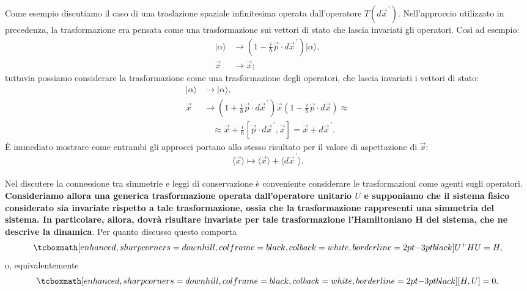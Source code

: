 Come esempio discutiamo il caso di una traslazione spaziale infinitesima operata dall'operatore $T(d\vec{x}^{\,\prime})$.
Nell'approccio utilizzato in precedenza, la trasformazione era pensata come una trasformazione sui vettori di stato che lascia invariati gli operatori. Così ad esempio:
	\begin{align}
		  |\alpha \rangle &\rightarrow (1- \frac{i}{\hbar}\vec{p}\cdot d\vec{x}^{\, \prime}) |\alpha \rangle ,  \\
		  \vec{x}&\rightarrow \vec{x};  
	\end{align}
tuttavia possiamo considerare la trasformazione come una trasformazione degli operatori, che lascia invariati i vettori di stato:
	\begin{align}
			|\alpha \rangle &\rightarrow  |\alpha \rangle , \\
			\vec{x} &\rightarrow \left(1+ \frac{i}{\hbar} \vec{p}\cdot d\vec{x}^{\, \prime}\right) \vec{x} \left(1-\frac{i}{\hbar} \vec{p} \cdot d\vec{x}\right) \approx  \nonumber\\
			& \quad \approx\vec{x}+ \frac{i}{\hbar}[\vec{p}\cdot d\vec{x}^{\, \prime},\vec{x}]=  \vec{x}+ d\vec{x}^{\, \prime} .
	\end{align}
È immediato mostrare come entrambi gli approcci portano allo stesso risultato per il valore di aspettazione di $\vec{x}$:
	\begin{equation}
		\langle \vec{x} \rangle  \mapsto \langle \vec{x}\rangle + \langle d\vec{x}^{\, \prime} \rangle.
	\end{equation}\\

Nel discutere la connessione tra simmetrie e leggi di conservazione è conveniente considerare le trasformazioni come agenti sugli operatori. \textbf{Consideriamo allora una generica trasformazione operata dall'operatore unitario ${U}$ e supponiamo che il sistema fisico considerato sia invariate rispetto a tale trasformazione, ossia che la trasformazione rappresenti una simmetria del sistema. In particolare, allora, dovrà risultare invariate per tale trasformazione l'Hamiltoniano H del sistema, che ne descrive la dinamica}. Per quanto discusso questo comporta
	\begin{equation}
		\tcboxmath[enhanced, sharp corners=downhill, colframe=black, colback=white, borderline={2pt}{-3pt}{black}]{
			{U}^+H{U}= H,
			}
	\end{equation}
o, equivalentemente 
	\begin{equation}
	\label{eq:cap12_5}
		\tcboxmath[enhanced, sharp corners=downhill, colframe=black, colback=white, borderline={2pt}{-3pt}{black}]{
			[H,{U}]=0.
			}
	\end{equation}\\

